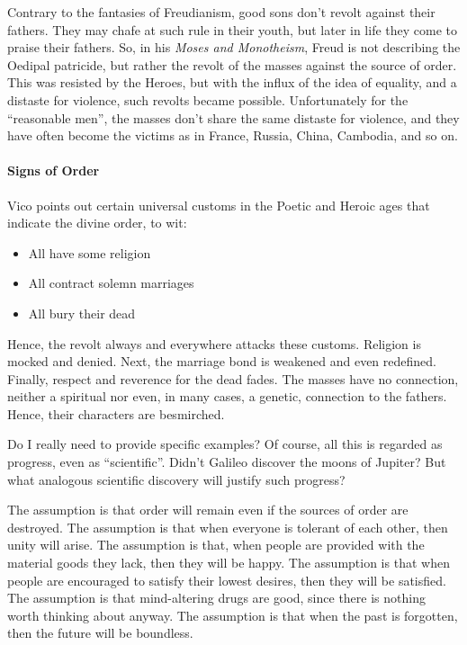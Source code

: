 Contrary to the fantasies of Freudianism, good sons don't revolt against their fathers. They may chafe at such rule in their youth, but later in life they come to praise their fathers. So, in his \emph{Moses and Monotheism}, Freud is not describing the Oedipal patricide, but rather the revolt of the masses against the source of order. This was resisted by the Heroes, but with the influx of the idea of equality, and a distaste for violence, such revolts became possible. Unfortunately for the ``reasonable men'', the masses don't share the same distaste for violence, and they have often become the victims as in France, Russia, China, Cambodia, and so on.

\paragraph{Signs of Order}


Vico points out certain universal customs in the Poetic and Heroic ages that indicate the divine order, to wit:

\begin{itemize}


\item All have some religion

\item All contract solemn marriages

\item All bury their dead
\end{itemize}


Hence, the revolt always and everywhere attacks these customs. Religion is mocked and denied. Next, the marriage bond is weakened and even redefined. Finally, respect and reverence for the dead fades. The masses have no connection, neither a spiritual nor even, in many cases, a genetic, connection to the fathers. Hence, their characters are besmirched.

Do I really need to provide specific examples? Of course, all this is regarded as progress, even as ``scientific''. Didn't Galileo discover the moons of Jupiter? But what analogous scientific discovery will justify such progress?

The assumption is that order will remain even if the sources of order are destroyed. The assumption is that when everyone is tolerant of each other, then unity will arise. The assumption is that, when people are provided with the material goods they lack, then they will be happy. The assumption is that when people are encouraged to satisfy their lowest desires, then they will be satisfied. The assumption is that mind-altering drugs are good, since there is nothing worth thinking about anyway. The assumption is that when the past is forgotten, then the future will be boundless.


